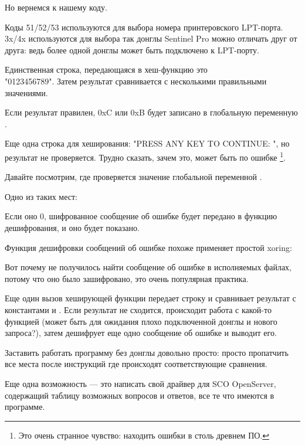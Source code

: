 Но вернемся к нашему коду.

Коды 51/52/53 используются для выбора номера принтеровского LPT-порта.
3x/4x используются для выбора  так донглы Sentinel Pro
можно отличать друг от друга: ведь более одной донглы может быть подключено к LPT-порту.

Единственная строка, передающаяся в хеш-функцию это\\
 "0123456789".
Затем результат сравнивается с несколькими правильными значениями.

Если результат правилен, 0xC или 0xB будет записано в глобальную переменную .

Еще одна строка для хеширования:
"PRESS ANY KEY TO CONTINUE: ", но результат не проверяется.
Трудно сказать, зачем это, может быть по ошибке
\footnote{Это очень странное чувство: находить ошибки в столь древнем ПО.}.

Давайте посмотрим, где проверяется значение глобальной переменной .

Одно из таких мест:



Если оно 0, шифрованное сообщение об ошибке будет передано в функцию дешифрования, и оно будет 
показано.

Функция дешифровки сообщений об ошибке похоже применяет простой \gls{xoring}:



Вот почему не получилось найти сообщение об ошибке в исполняемых файлах, потому что оно было
зашифровано, это очень популярная практика.

Еще один вызов хеширующей функции передает строку
 и сравнивает результат с константами
 и .
Если результат не сходится, происходит работа с какой-то функцией  
(может быть для ожидания плохо подключенной донглы и нового запроса?), затем дешифрует
еще одно сообщение об ошибке и выводит его.



Заставить работать программу без донглы довольно просто: просто пропатчить все места после инструкций
\CMP где происходят соответствующие сравнения.

Еще одна возможность --- это написать свой драйвер для SCO OpenServer, содержащий таблицу возможных вопросов и ответов, все те что имеются в программе.

